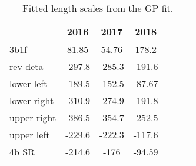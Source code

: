 \begin{table}
\centering
\caption{Fitted length scales from the GP fit.}
\label{tab:len-scales}
\begin{tabular}{lcccccc}
\toprule
{} &   2016 &   2017 &   2018 \\
\midrule
3b1f        &  81.85 &  54.76 &  178.2 \\
rev deta    & -297.8 & -285.3 & -191.6 \\
lower left  & -189.5 & -152.5 & -87.67 \\
lower right & -310.9 & -274.9 & -191.8 \\
upper right & -386.5 & -354.7 & -252.5 \\
upper left  & -229.6 & -222.3 & -117.6 \\
4b SR       & -214.6 &   -176 & -94.59 \\
\bottomrule
\end{tabular}
\end{table}
